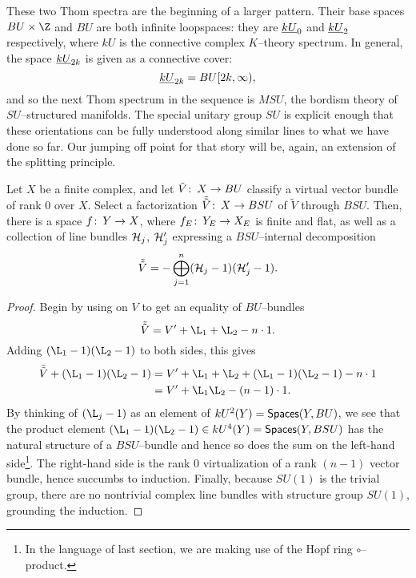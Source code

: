 These two Thom spectra are the beginning of a larger pattern.  Their base spaces $BU \times \Z$ and $BU$ are both infinite loopspaces: they are $\underline{\smash{kU}}_{0}$ and $\underline{\smash{kU}}_{2}$ respectively, where $kU$ is the connective complex $K$--theory spectrum.  In general, the space $\underline{\smash{kU}}_{2k}$ is given as a connective cover: \[\underline{\smash{kU}}_{2k} = BU[2k, \infty),\] and so the next Thom spectrum in the sequence is $MSU$, the bordism theory of $SU$--structured manifolds.  The special unitary group $SU$ is explicit enough that these orientations can be fully understood along similar lines to what we have done so far.  Our jumping off point for that story will be, again, an extension of the splitting principle.
\begin{lemma}\label{SplittingPrincipleForBSU}
Let $X$ be a finite complex, and let $\tilde V\colon\thinspace X \to BU$ classify a virtual vector bundle of rank $0$ over $X$.  Select a factorization $\tilde{\tilde V}\colon\thinspace X \to BSU$ of $\tilde V$ through $BSU$.  Then, there is a space $f\colon\thinspace Y \to X$, where $f_E\colon\thinspace Y_E \to X_E$ is finite and flat, as well as a collection of line bundles $\mathcal{H}_j$, $\mathcal{H}'_j$ expressing a $BSU$--internal decomposition \[\tilde{\tilde V} = -\bigoplus_{j=1}^n (\mathcal{H}_j - 1)(\mathcal{H}'_j - 1).\] 
\end{lemma}
\begin{proof}
Begin by using  on $V$ to get an equality of $BU$--bundles \[\tilde{\tilde V} = V' + \L_1 + \L_2 - n \cdot 1.\]  Adding $(\L_1 - 1)(\L_2 - 1)$ to both sides, this gives
\begin{align*}
\tilde{\tilde V} + (\L_1 - 1)(\L_2 - 1) & = V' + \L_1 + \L_2 + (\L_1 - 1)(\L_2 - 1) - n \cdot 1 \\
& = V' + \L_1\L_2 - (n-1) \cdot 1.
\end{align*}
By thinking of $(\L_j - 1)$ as an element of $kU^2(Y) = \mathsf{Spaces}(Y, BU)$, we see that the product element $(\L_1 - 1)(\L_2 - 1) \in kU^4(Y) = \CatOf{Spaces}(Y, BSU)$ has the natural structure of a $BSU$--bundle and hence so does the sum on the left-hand side\footnote{In the language of last section, we are making use of the Hopf ring $\circ$--product.}.  The right-hand side is the rank $0$ virtualization of a rank $(n-1)$ vector bundle, hence succumbs to induction.  Finally, because $SU(1)$ is the trivial group, there are no nontrivial complex line bundles with structure group $SU(1)$, grounding the induction.
\end{proof}

